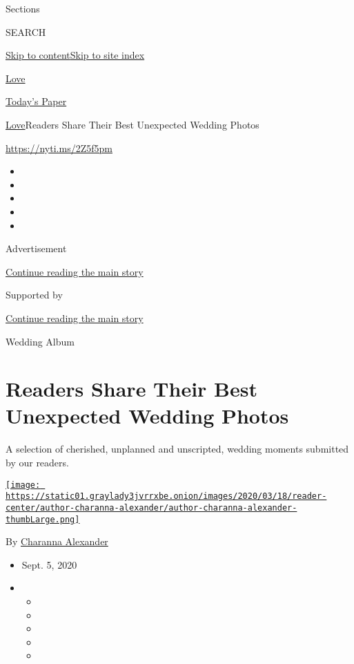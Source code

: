 Sections

SEARCH

\protect\hyperlink{site-content}{Skip to
content}\protect\hyperlink{site-index}{Skip to site index}

\href{https://www.nytimes3xbfgragh.onion/section/fashion/weddings}{Love}

\href{https://myaccount.nytimes3xbfgragh.onion/auth/login?response_type=cookie\&client_id=vi}{}

\href{https://www.nytimes3xbfgragh.onion/section/todayspaper}{Today's
Paper}

\href{/section/fashion/weddings}{Love}\textbar{}Readers Share Their Best
Unexpected Wedding Photos

\url{https://nyti.ms/2Z5f5pm}

\begin{itemize}
\item
\item
\item
\item
\item
\end{itemize}

Advertisement

\protect\hyperlink{after-top}{Continue reading the main story}

Supported by

\protect\hyperlink{after-sponsor}{Continue reading the main story}

Wedding Album

\hypertarget{readers-share-their-best-unexpected-wedding-photos}{%
\section{Readers Share Their Best Unexpected Wedding
Photos}\label{readers-share-their-best-unexpected-wedding-photos}}

A selection of cherished, unplanned and unscripted, wedding moments
submitted by our readers.

\href{https://www.nytimes3xbfgragh.onion/by/charanna-alexander}{\texttt{[image: https://static01.graylady3jvrrxbe.onion/images/2020/03/18/reader-center/author-charanna-alexander/author-charanna-alexander-thumbLarge.png]}}

By
\href{https://www.nytimes3xbfgragh.onion/by/charanna-alexander}{Charanna
Alexander}

\begin{itemize}
\item
  Sept. 5, 2020
\item
  \begin{itemize}
  \item
  \item
  \item
  \item
  \item
  \end{itemize}
\end{itemize}

